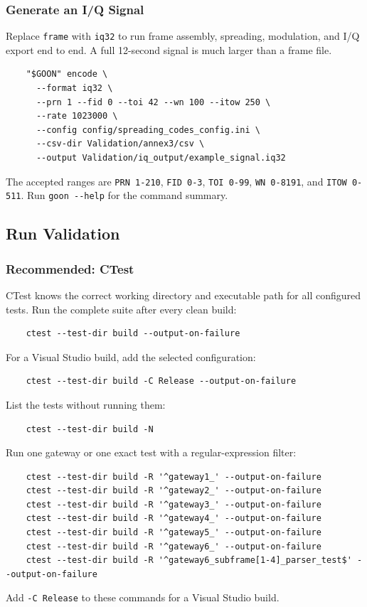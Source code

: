 \documentclass{article}
\begin{document}
\subsubsection*{Generate an I/Q Signal}

Replace \verb|frame| with \verb|iq32| to run frame assembly, spreading, modulation, and I/Q export end to end. A full 12-second signal is much larger than a frame file.
\begin{verbatim}
    "$GOON" encode \
      --format iq32 \
      --prn 1 --fid 0 --toi 42 --wn 100 --itow 250 \
      --rate 1023000 \
      --config config/spreading_codes_config.ini \
      --csv-dir Validation/annex3/csv \
      --output Validation/iq_output/example_signal.iq32
\end{verbatim}
The accepted ranges are \verb|PRN 1-210|, \verb|FID 0-3|, \verb|TOI 0-99|, \verb|WN 0-8191|, and \verb|ITOW 0-511|.
Run \verb|goon --help| for the command summary.

\subsection*{Run Validation}

\subsubsection*{Recommended: CTest}

CTest knows the correct working directory and executable path for all configured tests. Run the complete suite after every clean build:
\begin{verbatim}
    ctest --test-dir build --output-on-failure
\end{verbatim}
For a Visual Studio build, add the selected configuration:
\begin{verbatim}
    ctest --test-dir build -C Release --output-on-failure
\end{verbatim}
List the tests without running them:
\begin{verbatim}
    ctest --test-dir build -N
\end{verbatim}
Run one gateway or one exact test with a regular-expression filter:
\begin{verbatim}
    ctest --test-dir build -R '^gateway1_' --output-on-failure
    ctest --test-dir build -R '^gateway2_' --output-on-failure
    ctest --test-dir build -R '^gateway3_' --output-on-failure
    ctest --test-dir build -R '^gateway4_' --output-on-failure
    ctest --test-dir build -R '^gateway5_' --output-on-failure
    ctest --test-dir build -R '^gateway6_' --output-on-failure
    ctest --test-dir build -R '^gateway6_subframe[1-4]_parser_test$' --output-on-failure
\end{verbatim}
Add \verb|-C Release| to these commands for a Visual Studio build.
\end{document}
